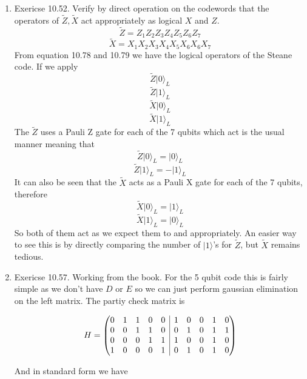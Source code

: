 \documentclass[12pt]{article}
\newcommand{\ket}[1]{\vert{#1}\rangle}
\newcommand{\rvline}{\hspace*{-\arraycolsep}\vline\hspace*{-\arraycolsep}}
\begin{document}
\begin{enumerate}
    \item Exericse 10.52. Verify by direct operation on the codewords that the operators of $\tilde{Z}, \tilde{X}$ act appropriately as logical $X$ and $Z$. 
    $$ \tilde{Z} = Z_1 Z_2 Z_3 Z_4 Z_5 Z_6 Z_7$$ 
    $$ \tilde{X} = X_1 X_2 X_3 X_4 X_5 X_6 X_6 X_7 $$
    From equation 10.78 and 10.79 we have the logical operators of the Steane code. If we apply 
    $$ \tilde{Z} \ket{0}_L $$
    $$ \tilde{Z} \ket{1}_L $$
    $$ \tilde{X} \ket{0}_L $$
    $$ \tilde{X} \ket{1}_L $$
    The $\tilde{Z}$ uses a Pauli Z gate for each of the 7 qubits which act is the usual manner meaning that 
    $$ \tilde{Z} \ket{0}_L = \ket{0}_L $$
    $$ \tilde{Z} \ket{1}_L = - \ket{1}_L $$
    It can also be seen that the $\tilde{X}$ acts as a Pauli X gate for each of the 7 qubits, therefore 
    $$ \tilde{X} \ket{0}_L = \ket{1}_L $$
    $$ \tilde{X} \ket{1}_L =  \ket{0}_L $$
    So both of them act as we expect them to and appropriately. An easier way to see this is by directly comparing the number of $\ket{1}$'s for $\tilde{Z}$, but $\tilde{X}$ remains tedious. 
    
    \item Exericse 10.57. Working from the book. For the 5 qubit code this is fairly simple as we don't have $D$ or $E$ so we can just perform gaussian elimination on the left matrix. The partiy check matrix is 


    $$ H = \begin{pmatrix}
        \begin{matrix}
            0 & 1 & 1 & 0 & 0  \\
            0 & 0 & 1 & 1 & 0   \\
            0 & 0 & 0 & 1 &1 \\
            1 & 0 & 0 & 0 & 1 
        \end{matrix} & \rvline &
        \begin{matrix}
            1 & 0 & 0 & 1 & 0 \\
            0 & 1 & 0 & 1 & 1 \\
            1 & 0 & 0 & 1 & 0 \\
            0 & 1 & 0 & 1 & 0 \\
        \end{matrix} 
    \end{pmatrix} $$
    
    And in standard form we have 



\end{enumerate}
\end{document}
